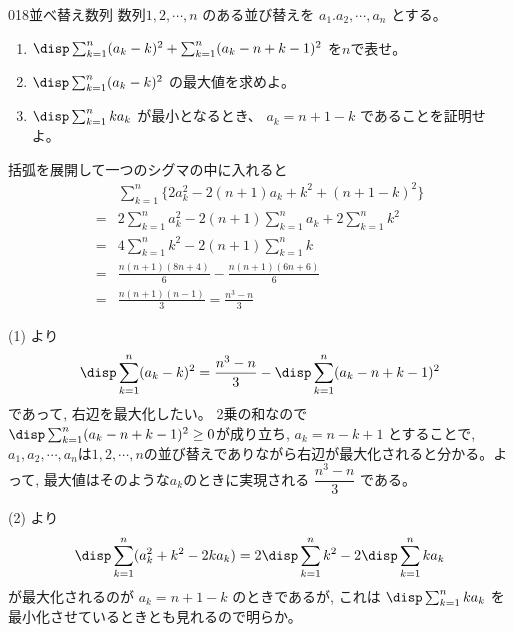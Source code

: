 \begin{prob}{018}{}{並べ替え数列}
 数列$1,2,\cdots, n$ のある並び替えを $a_1.a_2,\cdots , a_n$ とする。\\
 \begin{enumerate}
  \item $\disp \sum_{k=1}^n(a_k-k)^2+\sum^n_{k=1}(a_k-n+k-1)^2$ を$n$で表せ。
  \item $\disp \sum_{k=1}^n(a_k-k)^2$ の最大値を求めよ。
  \item $\disp \sum_{k=1}^nka_k$ が最小となるとき、 $a_k=n+1-k$ であることを証明せよ。
 \end{enumerate}
\end{prob}

括弧を展開して一つのシグマの中に入れると 
\begin{align*}
&\sum_{k=1}^n \{2a_k^2-2(n+1)a_k + k^2 + (n+1-k)^2 \}\\
=& 2\sum_{k=1}^na_k^2 -2(n+1)\sum_{k=1}^na_k + 2\sum_{k=1}^n k^2\\
=& 4\sum_{k=1}^nk^2 - 2(n+1)\sum_{k=1}^nk\\
=& \frac{n(n+1)(8n+4)}{6} - \frac{n(n+1)(6n+6)}{6}\\
=& \frac{n(n+1)(n-1)}{3}=\frac{n^3-n}{3}
\end{align*}

(1) より
\[\disp\sum_{k=1}^n(a_k-k)^2 = \dfrac{n^3-n}{3}-\disp\sum_{k=1}^n (a_k-n+k-1)^2\]
であって, 右辺を最大化したい。 2乗の和なので$\disp\sum_{k=1}^n (a_k-n+k-1)^2\geq 0$が成り立ち, $a_k=n-k+1$ とすることで, $a_1,a_2,\cdots, a_n$は$1,2,\cdots ,n$の並び替えでありながら右辺が最大化されると分かる。よって, 最大値はそのような$a_k$のときに実現される $\dfrac{n^3-n}{3}$ である。

(2) より
\[ \disp\sum_{k=1}^n (a_k^2+k^2 -2ka_k)=2\disp\sum_{k=1}^n k^2 -2\disp\sum_{k=1}^n ka_k\]
が最大化されるのが $a_k=n+1-k$ のときであるが, これは $\disp\sum_{k=1}^n ka_k$ を最小化させているときとも見れるので明らか。

